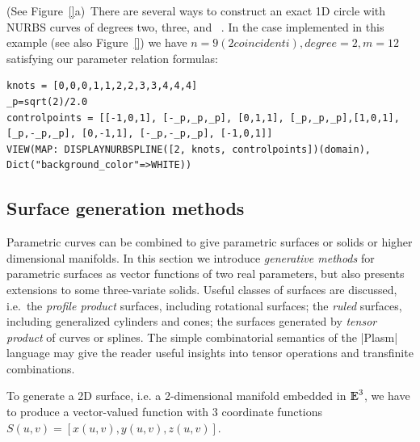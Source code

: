 \begin{coding}[Algebraic computation of FE = $\delta_1$]
\begin{condition} (See Figure~\ref{}a)\
There are several ways to construct an exact 1D circle with NURBS curves of degrees two, three, and \four~\cite{Eberly/ww.geometrictools.com/}. In the case implemented in this example (see also Figure~\ref{}) we have
$n=9 (2 coincidenti), degree=2, m=12$ satisfying our parameter relation formulas:
\begin{lstlisting}[language=JuliaLocal, style=julia, mathescape=true]
knots = [0,0,0,1,1,2,2,3,3,4,4,4]
_p=sqrt(2)/2.0
controlpoints = [[-1,0,1], [-_p,_p,_p], [0,1,1], [_p,_p,_p],[1,0,1], [_p,-_p,_p], [0,-1,1], [-_p,-_p,_p], [-1,0,1]]
VIEW(MAP: DISPLAYNURBSPLINE([2, knots, controlpoints])(domain), Dict("background_color"=>WHITE))
\end{lstlisting}
\end{condition}


\subsection{ Surface generation methods}\label{sect:5-4-2}

Parametric curves can be combined to give parametric surfaces or
solids or higher dimensional manifolds.  In this section we introduce \emph{generative methods} for parametric surfaces as
vector functions of two real parameters, but also presents extensions
to some three-variate solids.  Useful classes of surfaces are discussed, i.e.~the \emph{profile
product} surfaces, including rotational surfaces; the \emph{ruled}
surfaces, including generalized cylinders and cones; the surfaces
generated by \emph{tensor product} of curves or splines. 
The simple combinatorial semantics of the |Plasm| language
may give the reader useful insights into tensor operations and
transfinite combinations.


To generate a 2D surface, i.e. a 2-dimensional manifold embedded in $\mathbb{I\!\!E}^3$, we have to produce a vector-valued function with 3 coordinate functions $S(u,v) = [x(u,v), y(u,v), z(u,v)]$.



\end{coding}
